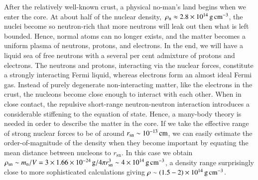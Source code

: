 
After the relatively well-known crust, a physical no-man's land begins when we enter the core.
At about half of the nuclear density, $\, \rho_{\mathrm{n}}  \approx 2.8 \times 10^{14}\, \mathrm{g}\,\mathrm{cm}^{-3}$, the nuclei become so neutron-rich that more neutrons will leak out then what is left bounded.
Hence, normal atoms can no longer exists, and the matter becomes a uniform plasma of neutrons, protons, and electrons.
In the end, we will have a liquid sea of free neutrons with a several per cent admixture of protons and electrons.
The neutrons and protons, interacting via the nuclear forces, constitute a strongly interacting Fermi liquid, whereas electrons form an almost ideal Fermi gas.
Instead of purely degenerate non-interacting matter, like the electrons in the crust, the nucleons become close enough to interact with each other.
When in close contact, the repulsive short-range neutron-neutron interaction introduces a considerable stiffening to the equation of state.
Hence, a many-body theory is needed in order to describe the matter in the core.
If we take the effective range of strong nuclear forces to be of around $r_{\mathrm{sn}} \sim 10^{-13}\, \mathrm{cm}$, we can easily estimate the order-of-magnitude of the density when they become important by equating the mean distance between nucleons to $r_{\mathrm{sn}}$.
In this case we obtain $\rho_{\mathrm{sn}} \sim m_{\mathrm{n}} / V = 3 \times 1.66 \times 10^{-24} \, \mathrm{g} / 4\pi r_{\mathrm{sn}}^3 \sim 4 \times 10^{14} \, \mathrm{g}\,\mathrm{cm}^{-3}$, a density range surprisingly close to more sophisticated calculations giving $\rho \sim (1.5 - 2) \times 10^{14} \, \mathrm{g}\,\mathrm{cm}^{-3}$.\cite{Hund36}


